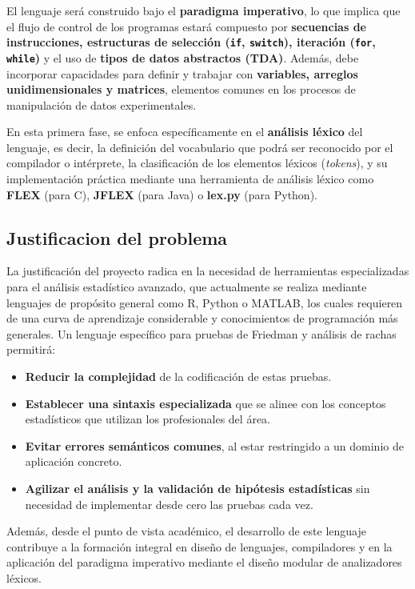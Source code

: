 \documentclass{article}
\begin{document}
El lenguaje será construido bajo el \textbf{paradigma imperativo}, lo que implica que el flujo de control de los programas estará compuesto por \textbf{secuencias de instrucciones, estructuras de selección (\texttt{if}, \texttt{switch}), iteración (\texttt{for}, \texttt{while})} y el uso de \textbf{tipos de datos abstractos (TDA)}. Además, debe incorporar capacidades para definir y trabajar con \textbf{variables, arreglos unidimensionales y matrices}, elementos comunes en los procesos de manipulación de datos experimentales.

En esta primera fase, se enfoca específicamente en el \textbf{análisis léxico} del lenguaje, es decir, la definición del vocabulario que podrá ser reconocido por el compilador o intérprete, la clasificación de los elementos léxicos (\emph{tokens}), y su implementación práctica mediante una herramienta de análisis léxico como \textbf{FLEX} (para C), \textbf{JFLEX} (para Java) o \textbf{lex.py} (para Python).

\subsection{Justificacion del problema}

La justificación del proyecto radica en la necesidad de herramientas especializadas para el análisis estadístico avanzado, que actualmente se realiza mediante lenguajes de propósito general como R, Python o MATLAB, los cuales requieren de una curva de aprendizaje considerable y conocimientos de programación más generales. Un lenguaje específico para pruebas de Friedman y análisis de rachas permitirá:

\begin{itemize}
  \item \textbf{Reducir la complejidad} de la codificación de estas pruebas.
  \item \textbf{Establecer una sintaxis especializada} que se alinee con los conceptos estadísticos que utilizan los profesionales del área.
  \item \textbf{Evitar errores semánticos comunes}, al estar restringido a un dominio de aplicación concreto.
  \item \textbf{Agilizar el análisis y la validación de hipótesis estadísticas} sin necesidad de implementar desde cero las pruebas cada vez.
\end{itemize}

Además, desde el punto de vista académico, el desarrollo de este lenguaje contribuye a la formación integral en diseño de lenguajes, compiladores y en la aplicación del paradigma imperativo mediante el diseño modular de analizadores léxicos.
\end{document}
